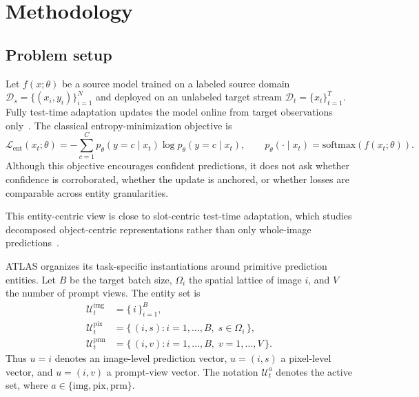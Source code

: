 \section{Methodology}


\subsection{Problem setup}

Let $f(x;\theta)$ be a source model trained on a labeled source domain
$\mathcal{D}_s=\{(x_i,y_i)\}_{i=1}^{N}$ and deployed on an unlabeled target
stream $\mathcal{D}_t=\{x_t\}_{t=1}^{T}$. Fully test-time adaptation updates
the model online from target observations only~\citep{wang2021tent,niu2022eata}.
The classical entropy-minimization objective is
\begin{equation}
\mathcal{L}_{\mathrm{ent}}(x_t;\theta)
=
-\sum_{c=1}^{C}
p_{\theta}(y=c\mid x_t)\log p_{\theta}(y=c\mid x_t),
\qquad
p_{\theta}(\cdot\mid x_t)=\mathrm{softmax}(f(x_t;\theta)).
\label{eq:tent}
\end{equation}
Although this objective encourages confident predictions, it does not ask
whether confidence is corroborated, whether the update is anchored, or whether
losses are comparable across entity granularities.

This entity-centric view is close to slot-centric test-time adaptation, which studies decomposed object-centric representations rather than only whole-image predictions~\citep{prabhudesai2023test}.

ATLAS organizes its task-specific instantiations around primitive prediction entities. Let $B$ be the
target batch size, $\Omega_i$ the spatial lattice of image $i$, and $V$ the
number of prompt views. The entity set is
\begin{equation}
\begin{aligned}
\mathcal{U}_t^{\mathrm{img}}
&=\{\,i\,\}_{i=1}^{B},\\
\mathcal{U}_t^{\mathrm{pix}}
&=\{\,(i,s): i=1,\ldots,B,\; s\in\Omega_i\,\},\\
\mathcal{U}_t^{\mathrm{prm}}
&=\{\,(i,v): i=1,\ldots,B,\; v=1,\ldots,V\,\}.
\end{aligned}
\label{eq:entity_sets}
\end{equation}
Thus $u=i$ denotes an image-level prediction vector, $u=(i,s)$ a pixel-level
vector, and $u=(i,v)$ a prompt-view vector. The notation $\mathcal{U}_t^a$
denotes the active set, where
$a\in\{\mathrm{img},\mathrm{pix},\mathrm{prm}\}$.

